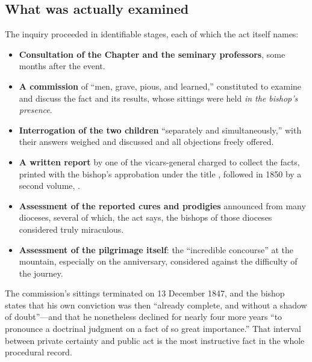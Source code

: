 \subsection{What was actually examined}

The inquiry proceeded in identifiable stages, each of which the act
itself names:

\begin{itemize}[leftmargin=1.2em,itemsep=0.15em,topsep=0.25em]
\item \textbf{Consultation of the Chapter and the seminary
professors}, some months after the event.
\item \textbf{A commission} of ``men, grave, pious, and learned,''
constituted to examine and discuss the fact and its results, whose
sittings were held \emph{in the bishop's presence}.
\item \textbf{Interrogation of the two children} ``separately and
simultaneously,'' with their answers weighed and discussed and all
objections freely offered.
\item \textbf{A written report} by one of the vicars-general charged
to collect the facts, printed with the bishop's approbation under
the title , followed in
1850 by a second volume, .
\item \textbf{Assessment of the reported cures and prodigies}
announced from many dioceses, several of which, the act says, the
bishops of those dioceses considered truly miraculous.
\item \textbf{Assessment of the pilgrimage itself}: the
``incredible concourse'' at the mountain, especially on the
anniversary, considered against the difficulty of the journey.
\end{itemize}

The commission's sittings terminated on 13 December 1847, and the
bishop states that his own conviction was then ``already complete,
and without a shadow of doubt''---and that he nonetheless declined
for nearly four more years ``to pronounce a doctrinal judgment on a
fact of so great importance.'' That interval between private
certainty and public act is the most instructive fact in the whole
procedural record.

